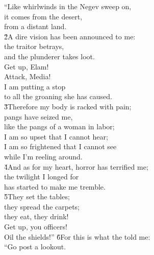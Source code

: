 \begin{poetry}
\poeml ``Like whirlwinds in the Negev sweep on, \\
\poemll    it comes from the desert, \\
\poemlll       from a distant land. \\
\poeml \v{2}A dire vision has been announced to me: \\
\poemll    the traitor betrays, \\
\poemlll       and the plunderer takes loot. \\
\poeml Get up, Elam! \\
\poemll    Attack, Media! \\
\poeml I am putting a stop \\
\poemll    to all the groaning she has caused. \\
\poeml \v{3}Therefore my body is racked with pain; \\
\poemll    pangs have seized me, \\
\poemlll       like the pangs of a woman in labor; \\
\poeml I am so upset that I cannot hear; \\
\poemll    I am so frightened that I cannot see \\
\poemll    while I'm reeling around. \\
\poeml \v{4}And as for my heart, horror has terrified me; \\
\poemll    the twilight I longed for \\
\poemlll       has started to make me tremble. \\
\poeml \v{5}They set the tables; \\
\poemll    they spread the carpets; \\
\poemlll       they eat, they drink! \\
\poeml Get up, you officers! \\
\poemll    Oil the shields!''
\poeml \v{6}For this is what the  told me: \\
\poeml ``Go post a lookout. \\

\end{poetry}
